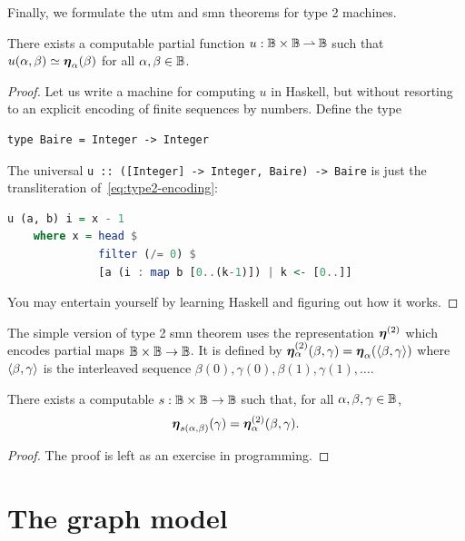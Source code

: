 Finally, we formulate the utm and smn theorems for type 2 machines.

\begin{theorem}
  There exists a computable partial function $u : \mathbb{B} \times
  \mathbb{B} \mathbin{\rightharpoonup} \mathbb{B}$ such that $u(\alpha, \beta) \simeq
  \text{\boldmath{$\eta$}}_{\alpha}(\beta)$ for all $\alpha, \beta \in \mathbb{B}$.
\end{theorem}

\begin{proof}
  Let us write a machine for computing $u$ in Haskell, but without
  resorting to an explicit encoding of finite sequences by numbers.
  Define the type
  \begin{lstlisting}
type Baire = Integer -> Integer
  \end{lstlisting}
  The universal \lstinline!u :: ([Integer] -> Integer, Baire) -> Baire! %
  is just the transliteration of~\eqref{eq:type2-encoding}:
  \begin{lstlisting}[language=Haskell]
u (a, b) i = x - 1
    where x = head $
              filter (/= 0) $
              [a (i : map b [0..(k-1)]) | k <- [0..]]
  \end{lstlisting}
  You may entertain yourself by learning Haskell and figuring out how
  it works.
\end{proof}

The simple version of type 2 smn theorem uses the representation
$\text{\boldmath{$\eta$}}^{(2)}$ which encodes partial maps $\mathbb{B} \times \mathbb{B} \to
\mathbb{B}$. It is defined by $\text{\boldmath{$\eta$}}^{(2)}_{\alpha}(\beta, \gamma) =
\text{\boldmath{$\eta$}}_{\alpha}(\langle \beta, \gamma \rangle)$ where $\langle \beta, \gamma \rangle$ is
the interleaved sequence $\beta(0), \gamma(0), \beta(1), \gamma(1),
\ldots$.

\begin{theorem}
  There exists a computable $s : \mathbb{B} \times \mathbb{B} \to \mathbb{B}$ such
  that, for all $\alpha, \beta, \gamma \in \mathbb{B}$,
  \begin{equation*}
    \text{\boldmath{$\eta$}}_{s(\alpha, \beta)}(\gamma) = \text{\boldmath{$\eta$}}^{(2)}_{\alpha}(\beta, \gamma).
  \end{equation*}
\end{theorem}

\begin{proof}
  The proof is left as an exercise in programming.
\end{proof}


\section{The graph model}
\label{sec:graph-model}

